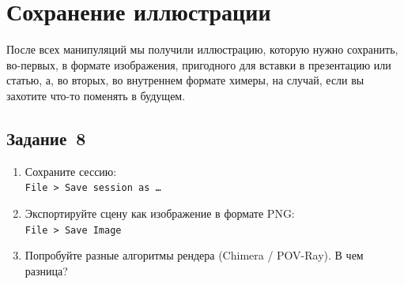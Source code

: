 \section{Сохранение иллюстрации}

После всех манипуляций мы получили иллюстрацию, которую нужно сохранить, во-первых, в формате изображения, пригодного для вставки в презентацию или статью, а, во вторых, во внутреннем формате химеры, на случай, если вы захотите что-то поменять в будущем.

\subsection*{Задание~8}
\begin{enumerate}
    \item Сохраните сессию:\\
    \texttt{File~> Save session as \dots}
    
    \item Экспортируйте сцену как изображение в формате PNG:\\
    \texttt{File~> Save Image}
    
    \item Попробуйте разные алгоритмы рендера (Chimera / POV-Ray). В чем разница?
\end{enumerate}

